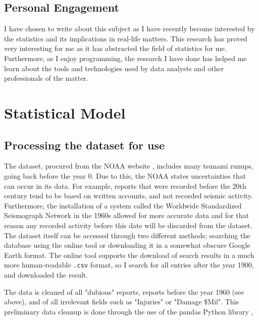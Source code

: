 \documentclass[11pt,letterpaper]{article}
\begin{document}
\subsection{Personal Engagement}

I have chosen to write about this subject as I have recently become interested by the 
statistics and its implications in real-life matters. This research has proved very 
interesting for me as it has abstracted the field of statistics for me. Furthermore, 
as I enjoy programming, the research I have done has helped me learn about the tools 
and technologies used by data analysts and other professionals of the matter. 


\section{}


\section{Statistical Model}

\subsection{Processing the dataset for use}

The dataset, procured from the NOAA website \cite{noaa}, includes many tsunami 
runups, going back before the year 0. Due to this, the NOAA states uncertainties 
that can occur in its data. For example, reports that were recorded before the 
20th century tend to be based on written accounts, and not recorded seismic activity. 
Furthermore, the installation of a system called the Worldwide Standardized Seismograph 
Network in the 1960s allowed for more accurate data and for that reason any recorded 
activity before this date will be discarded from the dataset. The dataset itself can 
be accessed through two different methods; searching the database using the online 
tool or downloading it in a somewhat obscure Google Earth format. The online tool 
supports the download of search results in a much more human-readable \verb|.csv| format, 
so I search for all entries after the year 1900, and downloaded the result. 

The data is cleaned of all "dubious" reports, reports before the year 1960 (see above), and 
of all irrelevant fields such as "Injuries" or "Damage \$Mil". This preliminary data cleanup 
is done through the use of the pandas Python library \cite{reback2020pandas}\cite{mckinney-proc-scipy-2010}, 
\end{document}

